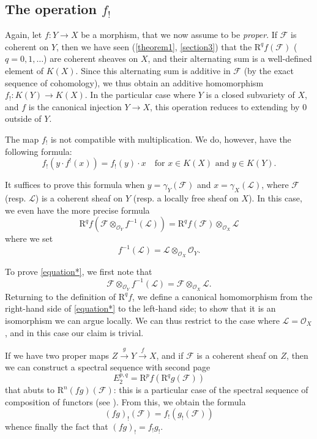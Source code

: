 \documentclass{article}
\theoremstyle{plain}
\theoremstyle{definition}
\newcommand{\sh}[1]{{\mathscr{#1}}}
\newcommand{\RR}{\mathrm{R}}
\newcommand{\oldpage}[1]{\marginpar{\footnotesize$\Big\vert$ \textit{p.~#1}}}
\begin{document}
\subsection{The operation \texorpdfstring{$f_!$}{f_!}}
\label{subsection5d}

Again, let $f\colon Y\to X$ be a morphism, that we now assume to be \emph{proper}.
If $\sh{F}$ is coherent on $Y$, then we have seen (\cref{theorem1}, \cref{section3}) that the $\RR^qf(\sh{F})$ ($q=0,1,\ldots$) are coherent sheaves on $X$, and their alternating sum is a well-defined element of $K(X)$.
Since this alternating sum is additive in $\sh{F}$ (by the exact sequence of cohomology), we thus obtain an additive homomorphism $f_!\colon K(Y)\to K(X)$.
In the particular case where $Y$ is a closed subvariety of $X$, and $f$ is the canonical injection $Y\to X$, this operation reduces to extending by $0$ outside of $Y$.

The map $f_!$ is not compatible with multiplication.
We do, however, have the following formula:
\[
  f_!(y\cdot f^!(x)) = f_!(y)\cdot x
  \quad
  \mbox{for $x\in K(X)$ and $y\in K(Y)$.}
\]

It suffices to prove this formula when $y=\gamma_Y(\sh{F})$ and $x=\gamma_X(\sh{L})$, where $\sh{F}$ (resp. $\sh{L}$) is a coherent sheaf on $Y$ (resp. a locally free sheaf on $X$).
In this case, we even have the more precise formula
\[
\label{equation*}
  \RR^qf(\sh{F}\otimes_{\sh{O}_Y}f^{-1}(\sh{L})) = \RR^qf(\sh{F})\otimes_{\sh{O}_X}\sh{L}
  \tag{$\star$}
\]
where we set
\[
  f^{-1}(\sh{L}) = \sh{L}\otimes_{\sh{O}_X}\sh{O}_Y.
\]

\oldpage{111}
To prove \cref{equation*}, we first note that
\[
  \sh{F}\otimes_{\sh{O}_Y}f^{-1}(\sh{L}) = \sh{F}\otimes_{\sh{O}_X}\sh{L}.
\]
Returning to the definition of $\RR^qf$, we define a canonical homomorphism from the right-hand side of \cref{equation*} to the left-hand side;
to show that it is an isomorphism we can argue locally.
We can thus restrict to the case where $\sh{L}=\sh{O}_X$, and in this case our claim is trivial.

If we have two proper maps $Z\xrightarrow{g}Y\xrightarrow{f}X$, and if $\sh{F}$ is a coherent sheaf on $Z$, then we can construct a spectral sequence with second page
\[
  E_2^{p,q} = \RR^pf(\RR^qg(\sh{F}))
\]
that abuts to $\RR^n(fg)(\sh{F})$:
this is a particular case of the spectral sequence of composition of functors (see \cite{7}).
From this, we obtain the formula
\[
  (fg)_!(\sh{F}) = f_!(g_!(\sh{F}))
\]
whence finally the fact that $(fg)_!=f_!g_!$.
\end{document}
